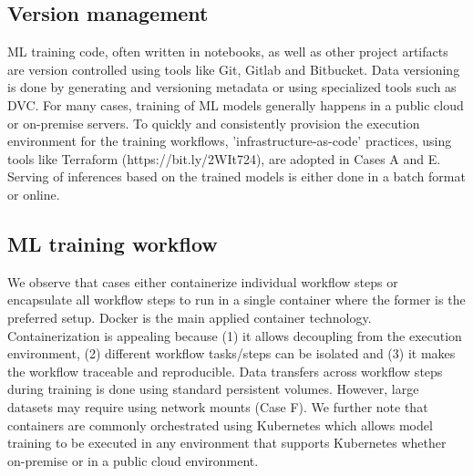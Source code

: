 






\subsection{Version management}
ML training code, often written in notebooks, as well as other project artifacts are version controlled using tools like Git, Gitlab and Bitbucket. Data versioning is done by generating and versioning metadata or using specialized tools such as DVC. %
For many cases, training of ML models generally happens in a public cloud or on-premise servers. To quickly and consistently provision the execution environment for the training workflows, 'infrastructure-as-code' practices, using tools like Terraform (https://bit.ly/2WIt724), are adopted in Cases A and E. Serving of inferences based on the trained models is either done in a batch format or online. 


\subsection{ML training workflow}
We observe that cases either containerize individual workflow steps or encapsulate all workflow steps to run in a single container where the former is the preferred setup. Docker is the main applied container technology. Containerization is appealing because (1) it allows decoupling from the execution environment, (2) different workflow tasks/steps can be isolated and (3) it makes the workflow traceable and reproducible. Data transfers across workflow steps during training is done using standard persistent volumes. However, large datasets may require using network mounts (Case F). We further note that containers are commonly orchestrated using Kubernetes which allows model training to be executed in any environment that supports Kubernetes whether on-premise or in a public cloud environment. %

